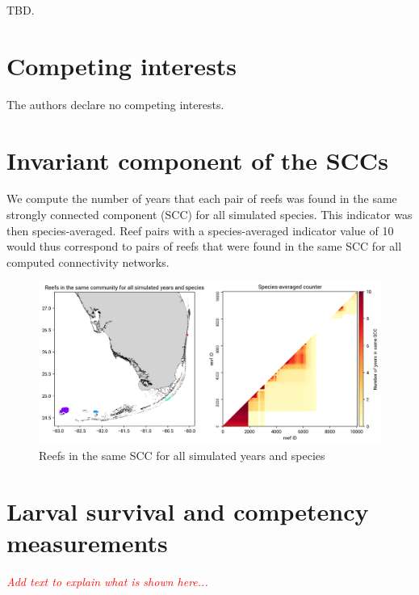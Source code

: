 \documentclass[preprint,12pt,authoryear]{elsarticle}
\newcommand{\emphc}[1]{\emph{\textcolor{red}{#1}}}
\begin{document}
TBD.

\section*{Competing interests}

The authors declare no competing interests.




\newpage


\appendix

\section{Invariant component of the SCCs}

We compute the number of years that each pair of reefs was found in the same strongly connected component (SCC) for all simulated species. This indicator was then species-averaged. Reef pairs with a species-averaged indicator value of 10 would thus correspond to pairs of reefs that were found in the same SCC for all computed connectivity networks.

\begin{figure}[h!]
    \centering
    \includegraphics[width=\textwidth]{figures/mean_counter.png}
    \caption{Reefs in the same SCC for all simulated years and species}\label{fig:mean_counter}
\end{figure}


\section{Larval survival and competency measurements}
\emphc{Add text to explain what is shown here...}
\end{document}
